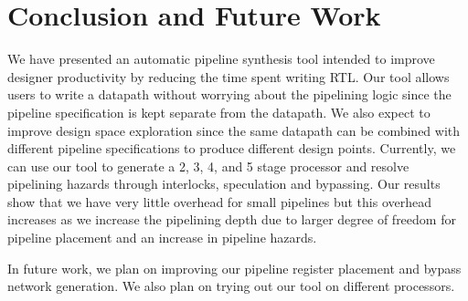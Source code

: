 \section{Conclusion and Future Work}
We have presented an automatic pipeline synthesis tool intended to
improve designer productivity by reducing the time spent writing
RTL. Our tool allows users to write a datapath without worrying about
the pipelining logic since the pipeline specification is kept separate
from the datapath. We also expect to improve design space exploration
since the same datapath can be combined with different pipeline
specifications to produce different design points. Currently, we can
use our tool to generate a 2, 3, 4, and 5 stage processor and resolve
pipelining hazards through interlocks, speculation and bypassing. Our
results show that we have very little overhead for small pipelines but
this overhead increases as we increase the pipelining depth due to
larger degree of freedom for pipeline placement and an increase in
pipeline hazards. 

In future work, we plan on improving our pipeline register placement
and bypass network generation. We also plan on trying out our tool on
different processors. 
